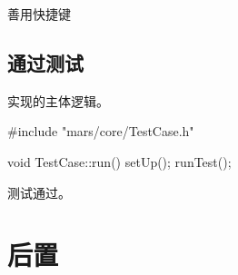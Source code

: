 \begin{content}
\begin{episode}{善用快捷键}
\begin{content}
\begin{enum}
\begin{enum}
\end{enum}

\end{enum}

\end{content}
\end{episode}

\subsection{通过测试}

实现的主体逻辑。

\begin{leftbar}
 \begin{c++}[caption={\ttfamily{src/mars/core/TestCase.cc}}]
#include "mars/core/TestCase.h"

void TestCase::run() {
  setUp();
  runTest();
}
 \end{c++}
\end{leftbar}

测试通过。

\end{content}

\section{后置}


